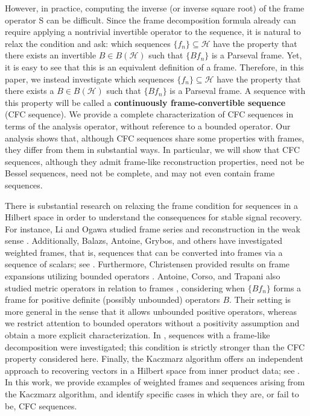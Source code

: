 \documentclass[11pt]{amsart}
\theoremstyle{definition}
\numberwithin{equation}{section}
\newcommand{\Hcal}{\mathcal{H}} %
\begin{document}
However, in practice, computing the inverse (or inverse square root) of the frame operator S can be difficult. Since the frame decomposition formula already can require applying a nontrivial invertible operator to the sequence, it is natural to relax the condition and ask:
which sequences $\{f_n\}\subseteq \Hcal$ have the property that there exists an invertible $B\in B(\Hcal)$ such that $\{Bf_n\}$ is a Parseval frame. Yet, it is easy to see that this is an equivalent definition of a frame. Therefore, in this paper, we instead investigate which sequences $\{f_n\}\subseteq \Hcal$ have the property that there exists a $B\in B(\Hcal)$ such that $\{Bf_n\}$ is a Parseval frame. A sequence with this property will be called a \textbf{continuously frame-convertible sequence} (CFC sequence). We provide a complete characterization of CFC sequences in terms of the analysis operator, without reference to a bounded operator. Our analysis shows that, although CFC sequences share some properties with frames, they differ from them in substantial ways. In particular, we will show that CFC sequences, although they admit frame-like reconstruction properties, need not be Bessel sequences, need not be complete, and may not even contain frame sequences.

There is substantial research on relaxing the frame condition for sequences in a Hilbert space in order to understand the consequences for stable signal recovery. For instance, Li and Ogawa studied frame series and reconstruction in the weak sense \cite{Li2001Pseudo-duals}. Additionally, Balazs, Antoine, Grybos, and others have investigated weighted frames, that is, sequences that can be converted into frames via a sequence of scalars; see \cite{Balazs2010Weighted, Dutkay2016Weighted, Balazs2023Weighted}. Furthermore, Christensen provided results on frame expansions utilizing bounded operators \cite{Christensen1995Frames}. Antoine, Corso, and Trapani also studied metric operators in relation to frames \cite{Antoine2021Lower}, considering when $\{Bf_n\}$ forms a frame for positive definite (possibly unbounded) operators $B$. Their setting is more general in the sense that it allows unbounded positive operators, whereas we restrict attention to bounded operators without a positivity assumption and obtain a more explicit characterization. In \cite{Berner2026Sequences}, sequences with a frame-like decomposition were investigated; this condition is strictly stronger than the CFC property considered here. Finally, the Kaczmarz algorithm offers an independent approach to recovering vectors in a Hilbert space from inner product data; see \cite{Kwapien2001Kaczmarz, Haller2005Kaczmarz}. In this work, we provide examples of weighted frames and sequences arising from the Kaczmarz algorithm, and identify specific cases in which they are, or fail to be, CFC sequences.
\end{document}
